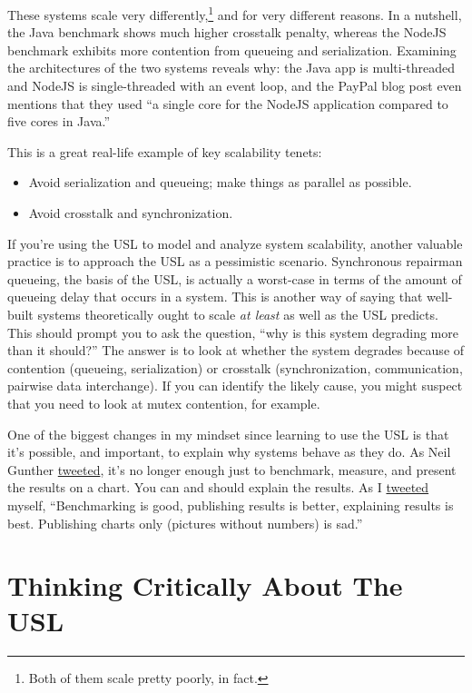 \documentclass{vivid_layout}
\begin{document}
These systems scale very differently,\footnote{Both of them scale pretty poorly,
in fact.} and for very different reasons.  In a nutshell, the Java benchmark
shows much higher crosstalk penalty, whereas the NodeJS benchmark exhibits more
contention from queueing and serialization. Examining the architectures of the
two systems reveals why: the Java app is multi-threaded and NodeJS is
single-threaded with an event loop, and the PayPal blog post even mentions that
they used ``a single core for the NodeJS application compared to five cores in
Java.''

This is a great real-life example of key scalability tenets:

\begin{itemize}
\item Avoid serialization and queueing; make things as parallel as possible.
\item Avoid crosstalk and synchronization.
\end{itemize}

If you're using the USL to model and analyze system scalability, another
valuable practice is to approach the USL as a pessimistic scenario. Synchronous
repairman queueing, the basis of the USL, is actually a worst-case in terms of
the amount of queueing delay that occurs in a system. This is another way of
saying that well-built systems theoretically ought to scale {\itshape at least}
as well as the USL predicts. This should prompt you to ask the question, ``why
is this system degrading more than it should?'' The answer is to look at
whether the system degrades because of contention (queueing, serialization) or
crosstalk (synchronization, communication, pairwise data interchange). If you
can identify the likely cause, you might suspect that you need to look at mutex
contention, for example.

One of the biggest changes in my mindset since learning to use the USL is that
it's possible, and important, to explain why systems behave as they do. As Neil
Gunther \href{https://twitter.com/DrQz/status/659086348729499649}{tweeted}, it's
no longer enough just to benchmark, measure, and present the results on a chart.
You can and should explain the results. As I
\href{https://twitter.com/xaprb/status/657354190109458433}{tweeted} myself,
``Benchmarking is good, publishing results is better, explaining results is
best. Publishing charts only (pictures without numbers) is sad.''

\newpage
\section{Thinking Critically About The USL}
\end{document}
